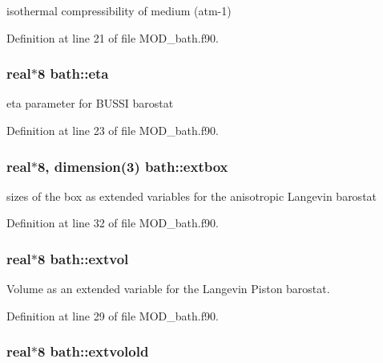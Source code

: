 isothermal compressibility of medium (atm-\/1) 



Definition at line 21 of file M\-O\-D\-\_\-bath.\-f90.

\hypertarget{classbath_a8b478b12a863eb9d056a1195f737df5d}{
\subsubsection[{eta}]{\setlength{\rightskip}{0pt plus 5cm}real$\ast$8 bath\-::eta}}\label{classbath_a8b478b12a863eb9d056a1195f737df5d}


eta parameter for B\-U\-S\-S\-I barostat 



Definition at line 23 of file M\-O\-D\-\_\-bath.\-f90.

\hypertarget{classbath_ae29a0bf200662ddefdf2f9abbe0f0497}{
\subsubsection[{extbox}]{\setlength{\rightskip}{0pt plus 5cm}real$\ast$8, dimension(3) bath\-::extbox}}\label{classbath_ae29a0bf200662ddefdf2f9abbe0f0497}


sizes of the box as extended variables for the anisotropic Langevin barostat 



Definition at line 32 of file M\-O\-D\-\_\-bath.\-f90.

\hypertarget{classbath_a962ae932f22d93aaa3d48d2bb5b0c914}{
\subsubsection[{extvol}]{\setlength{\rightskip}{0pt plus 5cm}real$\ast$8 bath\-::extvol}}\label{classbath_a962ae932f22d93aaa3d48d2bb5b0c914}


Volume as an extended variable for the Langevin Piston barostat. 



Definition at line 29 of file M\-O\-D\-\_\-bath.\-f90.

\hypertarget{classbath_a4024f294b8428f4eae1cdaf3a06ddf7e}{
\subsubsection[{extvolold}]{\setlength{\rightskip}{0pt plus 5cm}real$\ast$8 bath\-::extvolold}}\label{classbath_a4024f294b8428f4eae1cdaf3a06ddf7e}


